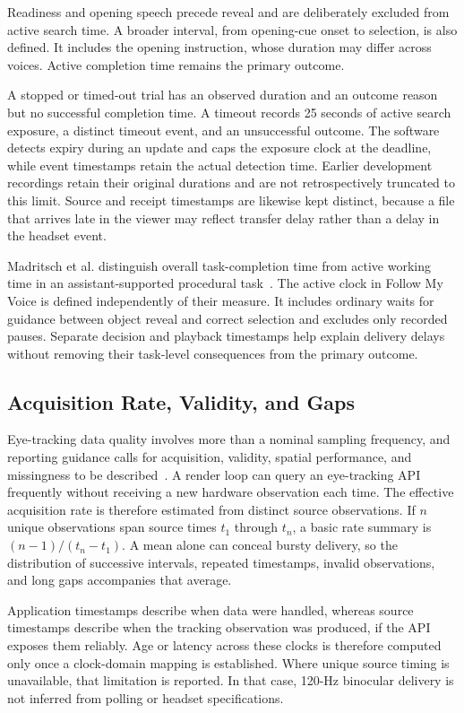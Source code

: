 Readiness and opening speech precede reveal and are deliberately excluded from active search time. A broader interval, from opening-cue onset to selection, is also defined. It includes the opening instruction, whose duration may differ across voices. Active completion time remains the primary outcome.

A stopped or timed-out trial has an observed duration and an outcome reason but no successful completion time. A timeout records 25 seconds of active search exposure, a distinct timeout event, and an unsuccessful outcome. The software detects expiry during an update and caps the exposure clock at the deadline, while event timestamps retain the actual detection time. Earlier development recordings retain their original durations and are not retrospectively truncated to this limit. Source and receipt timestamps are likewise kept distinct, because a file that arrives late in the viewer may reflect transfer delay rather than a delay in the headset event.

Madritsch et al. distinguish overall task-completion time from active working time in an assistant-supported procedural task~\cite{madritsch2026assistance}. The active clock in Follow My Voice is defined independently of their measure. It includes ordinary waits for guidance between object reveal and correct selection and excludes only recorded pauses. Separate decision and playback timestamps help explain delivery delays without removing their task-level consequences from the primary outcome.

\subsection{Acquisition Rate, Validity, and Gaps}
\label{sec:acquisition-rate}
Eye-tracking data quality involves more than a nominal sampling frequency, and reporting guidance calls for acquisition, validity, spatial performance, and missingness to be described~\cite{dunn2024reporting,niehorster2026dataquality}. A render loop can query an eye-tracking API frequently without receiving a new hardware observation each time. The effective acquisition rate is therefore estimated from distinct source observations. If $n$ unique observations span source times $t_1$ through $t_n$, a basic rate summary is $(n-1)/(t_n-t_1)$. A mean alone can conceal bursty delivery, so the distribution of successive intervals, repeated timestamps, invalid observations, and long gaps accompanies that average.

Application timestamps describe when data were handled, whereas source timestamps describe when the tracking observation was produced, if the API exposes them reliably. Age or latency across these clocks is therefore computed only once a clock-domain mapping is established. Where unique source timing is unavailable, that limitation is reported. In that case, 120-Hz binocular delivery is not inferred from polling or headset specifications.

